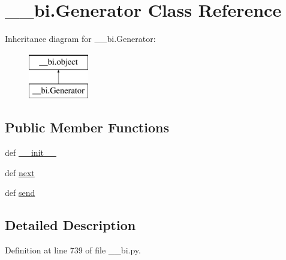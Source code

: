 \hypertarget{class____bi_1_1_generator}{\section{\-\_\-\-\_\-bi.\-Generator Class Reference}
\label{class____bi_1_1_generator}
}
Inheritance diagram for \-\_\-\-\_\-bi.\-Generator\-:\begin{figure}[H]
\begin{center}
\leavevmode
\includegraphics[height=2.000000cm]{class____bi_1_1_generator}
\end{center}
\end{figure}
\subsection*{Public Member Functions}
\begin{DoxyCompactItemize}
\item 
def \hyperlink{class____bi_1_1_generator_ae3469a81e9c059e0743fa31d1dbda941}{\-\_\-\-\_\-init\-\_\-\-\_\-}
\item 
def \hyperlink{class____bi_1_1_generator_a74cbc3353a5c4e5643a6c68b11db6afc}{next}
\item 
def \hyperlink{class____bi_1_1_generator_ace27d850b38bc0f785052d879b78d972}{send}
\end{DoxyCompactItemize}


\subsection{Detailed Description}


Definition at line 739 of file \-\_\-\-\_\-bi.\-py.



